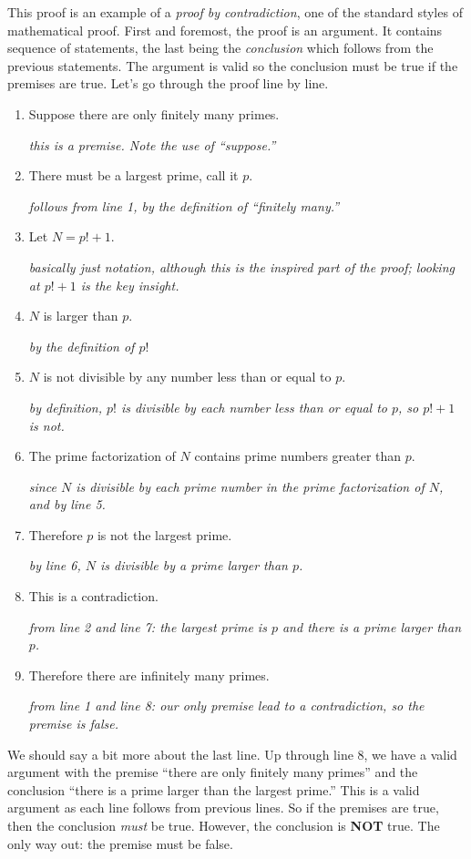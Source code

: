 \documentclass[12pt]{article}
\begin{document}
 This proof is an example of a {\em proof by contradiction}, one of the standard styles of mathematical proof.  First and foremost, the proof is an argument.  It contains sequence of statements, the last being the {\em conclusion} which follows from the previous statements.  The argument is valid so the conclusion must be true if the premises are true.  Let's go through the proof line by line.

 \begin{enumerate}
  \item Suppose there are only finitely many primes.

 \hfill{\em this is a premise.  Note the use of ``suppose.''}
 \item  There must be a largest prime, call it $p$.

 \hfill{\em follows from line 1, by the definition of ``finitely many.''}
 \item Let $N = p! + 1$.

 \hfill {\em basically just notation, although this is the inspired part of the proof; looking at $p! + 1$ is the key insight.}
 \item $N$ is larger than $p$.

 \hfill {\em by the definition of $p!$}
 \item $N$ is not divisible by any number less than or equal to $p$.

 \hfill {\em by definition, $p!$ is divisible by each number less than or equal to $p$, so $p! + 1$ is not.}
 \item The prime factorization of $N$ contains prime numbers greater than $p$.

 \hfill {\em since $N$ is divisible by each prime number in the prime factorization of $N$, and by line 5.}
 \item Therefore $p$ is not the largest prime.

 \hfill {\em by line 6, $N$ is divisible by a prime larger than $p$.}
 \item This is a contradiction.

 \hfill {\em from line 2 and line 7: the largest prime is $p$ and there is a prime larger than $p$.}
 \item Therefore there are infinitely many primes.

 \hfill {\em from line 1 and line 8: our only premise lead to a contradiction, so the premise is false.}
 \end{enumerate}

 We should say a bit more about the last line.  Up through line 8, we have a valid argument with the premise ``there are only finitely many primes'' and the conclusion ``there is a prime larger than the largest prime.''  This is a valid argument as each line follows from previous lines.  So if the premises are true, then the conclusion \emph{must} be true.  However, the conclusion is \textbf{NOT} true.  The only way out: the premise must be false.
\end{document}
